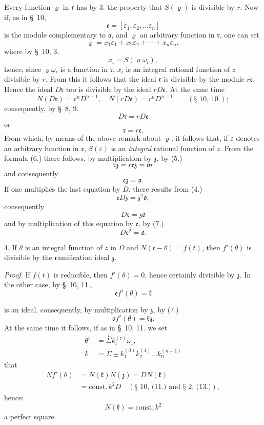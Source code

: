 \documentclass{article}
\begin{document}
Every function $\varrho$ in $\mathfrak{r}$ has by 3. the property that $S(\varrho)$ is divisible by $r$. Now if, as in §~10,
\[ \mathfrak{e} = [\varepsilon_{1}, \varepsilon_{2}, \ldots \varepsilon_{n}] \]
is the module complementary to $\mathfrak{o}$, and $\varrho$ an arbitrary function in $\mathfrak{r}$, one can set
\[ \varrho = x_{1}\varepsilon_{1} + x_{2}\varepsilon_{2} + \cdots + x_{n}\varepsilon_{n}, \]
where by §~10, 3.
\[ x_{\iota} = S(\varrho\omega_{\iota}), \]
hence, since $\varrho\omega_{\iota}$ is a function in $\mathfrak{r}$, $x_{\iota}$ is an integral rational function of $z$ divisible by $r$. From this it follows that the ideal $\mathfrak{r}$ is divisible by the module $r\mathfrak{e}$. Hence the ideal $D\mathfrak{r}$ too is divisible by the ideal $rD\mathfrak{e}$. At the same time
\[ N(D\mathfrak{r}) = r^{n}D^{n-1}, \quad N(rD\mathfrak{e}) = r^{n}D^{n-1} \qquad (\text{§~10, 10.}); \]
consequently, by §~8, 9.
\[ D\mathfrak{r} = rD\mathfrak{e} \]
or
\[ \mathfrak{r} = r\mathfrak{e}. \tag{6.} \]
From which, by means of the above remark about $\varrho$, it follows that, if $\varepsilon$ denotes an arbitrary function in $\mathfrak{e}$, $S(\varepsilon)$ is an \emph{integral} rational function of $z$. From the formula (6.) there follows, by multiplication by $\mathfrak{z}$, by (5.)
\[ \mathfrak{r}\mathfrak{z} = r\mathfrak{e}\mathfrak{z} = \mathfrak{o}r \]
and consequently
\[ \mathfrak{e}\mathfrak{z} = \mathfrak{o}. \tag{7.} \]
If one multiplies the last equation by $D$, there results from (4.)
\[ \mathfrak{e}D\mathfrak{z} = \mathfrak{z}^{2}\mathfrak{d}, \]
consequently
\[ D\mathfrak{e} = \mathfrak{z}\mathfrak{d} \tag{8.} \]
and by multiplication of this equation by $\mathfrak{e}$, by (7.)
\[ D\mathfrak{e}^{2} = \mathfrak{d}. \tag{9.} \]

4. If $\theta$ is an integral function of $z$ in $\Omega$ and $N(t-\theta) = f(t)$, then $f'(\theta)$ is divisible by the ramification ideal $\mathfrak{z}$.

\emph{Proof.} If $f(t)$ is reducible, then $f'(\theta) = 0$, hence certainly divisible by $\mathfrak{z}$. In the other case, by §~10, 11.,
\[ \mathfrak{e}f'(\theta) = \mathfrak{k} \]

is an ideal, consequently, by multiplication by $\mathfrak{z}$, by (7.)
\[ \mathfrak{o}f'(\theta) = \mathfrak{k}\mathfrak{z}. \tag{10.} \]
At the same time it follows, if as in §~10, 11. we set
\[ \begin{aligned} \theta^{r} &= \overset{\iota}{\Sigma} k_{\iota}^{(r)}\omega_{\iota}, \\ k &= \Sigma \pm k_{1}^{(0)}k_{2}^{(1)}\ldots k_{n}^{(n-1)} \end{aligned} \]
that
\[ \begin{aligned} Nf'(\theta) &= N(\mathfrak{k})N(\mathfrak{z}) = DN(\mathfrak{k}) \\ &= \text{const.}\,k^{2}D \quad (\text{§~10, (11.) and §~2, (13.)}), \end{aligned} \]
hence:
\[ N(\mathfrak{k}) = \text{const.}\,k^{2} \tag{11.} \]
a perfect square.
\end{document}
